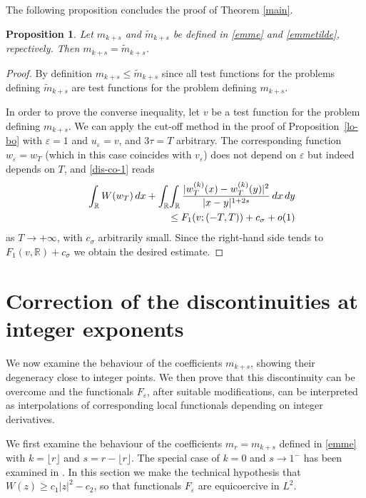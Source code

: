 \documentclass{article}
\newtheorem{proposition}[lemma]{Proposition}
\newcommand{\e}{\varepsilon}
\begin{document}
The following proposition  concludes the proof of Theorem \ref{main}.

\begin{proposition}
Let $m_{k+s}$ and $\widetilde m_{k+s}$ be defined in \eqref{emme} and \eqref{emmetilde}, repectively. Then $m_{k+s}=\widetilde m_{k+s}$.
\end{proposition}

\begin{proof} By definition $m_{k+s}\le\widetilde m_{k+s}$ since all test functions for the problems defining $\widetilde m_{k+s}$ are test functions for the problem defining 
$m_{k+s}$.

In order to prove the converse inequality, let $v$ be a test function for the problem defining $m_{k+s}$. We can apply the cut-off method in the proof of Proposition~\ref{lo-bo} with $\e=1$ and $u_\e=v$, and $3\tau=T$ arbitrary. The corresponding function $w_\e=w_T$ (which in this case coincides with $v_\e$) does not depend on $\e$ but indeed depends on $T$, and \eqref{dis-co-1} reads
\begin{eqnarray*}\nonumber\label{dis-co-3}
&&\hspace{-1cm}\int_{\mathbb R} W(w_T)\, dx+\int_{\mathbb R}\!\int_{\mathbb R} \frac{|w_T^{(k)}(x)-w_T^{(k)}(y)|^2}{|x-y|^{1+2s}}\, dx\, dy\\
&&\hspace{3cm}\leq 
F_1(v;(-T,T))+ c_\sigma+o(1)
\end{eqnarray*} 
as $T\to+\infty$, with $c_\sigma$ arbitrarily small. Since the right-hand side tends to $F_1(v,\mathbb R)+c_\sigma$ we obtain the desired estimate.
\end{proof}

\section{Correction of the discontinuities at integer exponents}
We now examine the behaviour of the coefficients $m_{k+s}$, showing their degeneracy close to integer points. We then prove that this discontinuity can be overcome and  the functionals $F_\e$, after suitable modifications, can be interpreted as interpolations of corresponding local functionals depending on integer derivatives. 

We first examine the behaviour of the coefficients $m_r=m_{k+s}$ defined in \eqref{emme} with $k=\lfloor r\rfloor$ and $s= r-\lfloor r\rfloor$. The special case of $k=0$ and $s\to 1^-$ has been examined in \cite{PaVi}. In this section we make the technical hypothesis that $W(z)\ge c_1|z|^2 -c_2$, so that functionals $F_\e$ are equicoercive in $L^2$.  
\end{document}

